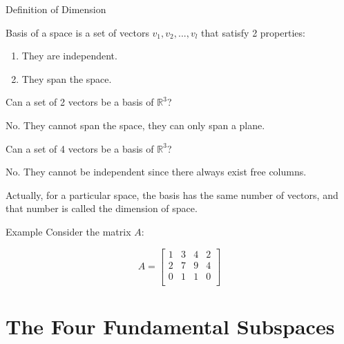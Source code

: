 \documentclass{beamer}
\begin{document}
\begin{frame}{Definition of Dimension}
\begin{definition}
Basis of a space is a set of vectors $v_1,v_2,...,v_l$ that satisfy 2 properties:
\begin{enumerate}
    \item They are independent.
    \item They span the space.
\end{enumerate}
\end{definition}

Can a set of 2 vectors be a basis of $\mathbb{R}^3$?

\vspace{3pt}
No. They cannot span the space, they can only span a plane.

\vspace{3pt}
Can a set of 4 vectors be a basis of $\mathbb{R}^3$?

\vspace{3pt}
No. They cannot be independent since there always exist free columns.

\vspace{3pt}
Actually, for a particular space, the basis has the same number of vectors, and that number is called the dimension of space.
\end{frame}

\begin{frame}{Example}
Consider the matrix $A$:

\begin{equation*}
    A=\left[ \begin{matrix}
        1&		3&		4&		2\\
        2&		7&		9&		4\\
        0&		1&		1&		0\\
    \end{matrix} \right]
\end{equation*}

\end{frame}

\section{The Four Fundamental Subspaces}
\begin{frame}

\end{frame}
\end{document}
